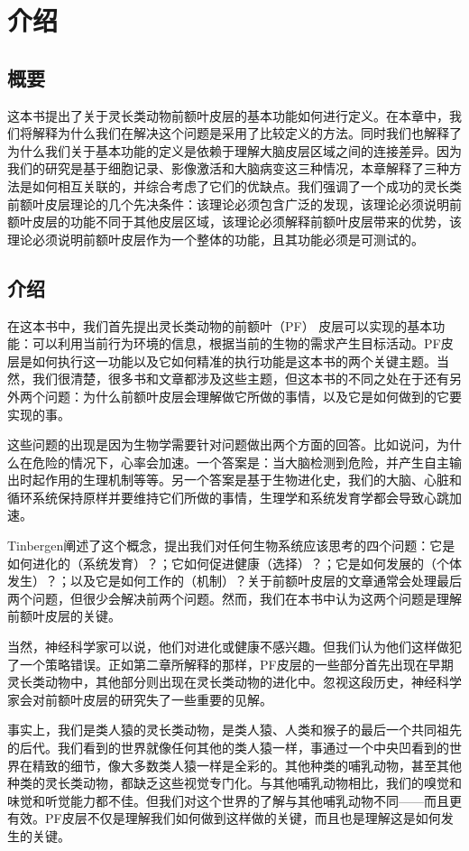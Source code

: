 

\chapter{介绍}

\section{概要}
这本书提出了关于灵长类动物前额叶皮层的基本功能如何进行定义。在本章中，我们将解释为什么我们在解决这个问题是采用了比较定义的方法。同时我们也解释了为什么我们关于基本功能的定义是依赖于理解大脑皮层区域之间的连接差异。因为我们的研究是基于细胞记录、影像激活和大脑病变这三种情况，本章解释了三种方法是如何相互关联的，并综合考虑了它们的优缺点。我们强调了一个成功的灵长类前额叶皮层理论的几个先决条件：该理论必须包含广泛的发现，该理论必须说明前额叶皮层的功能不同于其他皮层区域，该理论必须解释前额叶皮层带来的优势，该理论必须说明前额叶皮层作为一个整体的功能，且其功能必须是可测试的。

\section{介绍}
在这本书中，我们首先提出灵长类动物的前额叶（PF） 皮层可以实现的基本功能：可以利用当前行为环境的信息，根据当前的生物的需求产生目标活动。PF皮层是如何执行这一功能以及它如何精准的执行功能是这本书的两个关键主题。当然，我们很清楚，很多书和文章都涉及这些主题，但这本书的不同之处在于还有另外两个问题：为什么前额叶皮层会理解做它所做的事情，以及它是如何做到的它要实现的事。
\par 
这些问题的出现是因为生物学需要针对问题做出两个方面的回答。比如说问，为什么在危险的情况下，心率会加速。一个答案是：当大脑检测到危险，并产生自主输出时起作用的生理机制等等。另一个答案是基于生物进化史，我们的大脑、心脏和循环系统保持原样并要维持它们所做的事情，生理学和系统发育学都会导致心跳加速。
\par 
Tinbergen阐述了这个概念，提出我们对任何生物系统应该思考的四个问题：它是如何进化的（系统发育）？；它如何促进健康（选择）？；它是如何发展的（个体发生）？；以及它是如何工作的（机制）？关于前额叶皮层的文章通常会处理最后两个问题，但很少会解决前两个问题。然而，我们在本书中认为这两个问题是理解前额叶皮层的关键。
\par 
当然，神经科学家可以说，他们对进化或健康不感兴趣。但我们认为他们这样做犯了一个策略错误。正如第二章所解释的那样，PF皮层的一些部分首先出现在早期灵长类动物中，其他部分则出现在灵长类动物的进化中。忽视这段历史，神经科学家会对前额叶皮层的研究失了一些重要的见解。
\par 
事实上，我们是类人猿的灵长类动物，是类人猿、人类和猴子的最后一个共同祖先的后代。我们看到的世界就像任何其他的类人猿一样，事通过一个中央凹看到的世界在精致的细节，像大多数类人猿一样是全彩的。其他种类的哺乳动物，甚至其他种类的灵长类动物，都缺乏这些视觉专门化。与其他哺乳动物相比，我们的嗅觉和味觉和听觉能力都不佳。但我们对这个世界的了解与其他哺乳动物不同——而且更有效。PF皮层不仅是理解我们如何做到这样做的关键，而且也是理解这是如何发生的关键。

